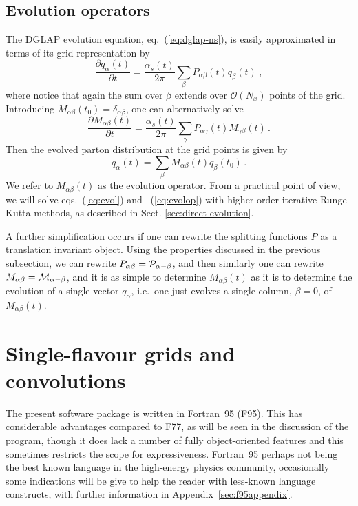 \documentclass[12pt]{article}
\newcommand{\lp}{\left(}
\newcommand{\rp}{\right)}
\begin{document}
\subsection{Evolution operators}
\label{sec:evop}
The DGLAP evolution equation, eq.~(\ref{eq:dglap-ns}), is easily 
approximated in terms of its grid representation by
\begin{equation}
\label{eq:evol}
  \frac{\partial q_{\alpha}(t)}{\partial t}  = \frac{\alpha_s(t)}{2\pi}
\sum_{\beta} P_{\alpha\beta}(t) q_\beta(t) \ ,
\end{equation}
where notice that again the sum over $\beta$ extends over
$\mathcal{O}\lp N_x \rp$ points of the grid.
Introducing $M_{\alpha\beta}(t_0) = \delta_{\alpha\beta}$, one can
alternatively solve
\begin{equation}
\label{eq:evolop}
  \frac{\partial M_{\alpha\beta}(t) }{\partial t} = \frac{\alpha_s(t)}{2\pi}
\sum_{\gamma} P_{\alpha\gamma}(t)
  M_{\gamma\beta}(t)\,.
\end{equation}
Then the evolved parton distribution at the grid points is
given by
\begin{equation}
  q_{\alpha}(t)  = \sum_{\beta} M_{\alpha\beta}(t) q_\beta(t_0)\,.
\end{equation}
We refer to $M_{\alpha\beta}(t)$ as the evolution operator. From 
a practical point of view, we will solve eqs.~(\ref{eq:evol})
and ~(\ref{eq:evolop})
with higher order iterative Runge-Kutta methods, as described in
Sect. \ref{sec:direct-evolution}.

A further simplification occurs 
if one can rewrite the splitting functions $P$ as
a translation invariant object. Using the properties
discussed in the previous subsection, 
we can rewrite $P_{\alpha\beta} = \cal P_{\alpha-\beta}$,
and then similarly one can rewrite $M_{\alpha\beta} = \cal
M_{\alpha-\beta}$, and it is as simple to determine
$M_{\alpha\beta}(t)$ as it is to determine the evolution of a single
vector $q_\alpha$, i.e.\ one just evolves a single column, $\beta =
0$, of $M_{\alpha\beta}(t)$.



\section{Single-flavour grids and convolutions}
\label{sec:singleflav}

The present 
software package is written in Fortran~95 (F95). This has considerable
advantages compared to F77, as will be seen in the discussion of the
program, though it does lack a number of fully object-oriented
features and this sometimes restricts the scope for expressiveness.
Fortran~95 perhaps not being the best known language in the
high-energy physics community, occasionally some indications will be give to
help the reader with less-known language constructs, with further
information in Appendix~\ref{sec:f95appendix}.
\end{document}
